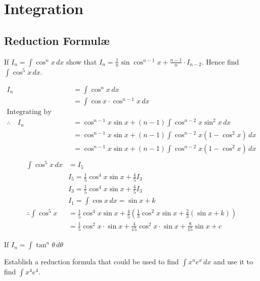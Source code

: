 \documentclass{standalone}
\begin{document}
	\chapter{Integration}
	\section{Reduction Formul\ae}
	
	\begin{example}
		If $I_n = \int \cos^n x \, dx$ show that $I_n = \frac{1}{n} \sin\cos^{n-1}x + \frac{n-1}{n}\cdot I_{n-2}$. Hence find $\int \cos^5x\, dx$.
	\end{example}
	
	\begin{align*}
							I_n  & = \int \cos^n x \, dx\\
								 & = \int \cos x \cdot \cos^{n-1}x\, dx\\
								 \text{Integrating by parts: }\\
			\therefore \quad I_n & = \cos^{n-1}x\sin x + (n-1)\int\cos^{n-2}x\sin^2x\,dx\\
								 & = \cos^{n-1}x\sin x + (n-1)\int\cos^{n-2}x(1-\cos^2x)\,dx\\
								 & = \cos^{n-1}x\sin x + (n-1)\int\cos^{n-2}x(1-\cos^2x)\,dx\\
	\end{align*}
	\begin{align*}
			\int \cos^5 x \, dx  & = I_5\\
							  	 & I_5 = \frac{1}{5} \cos^4x\sin x + \frac{4}{5}I_3\\
		& I_3 = \frac{1}{5} \cos^4x\sin x + \frac{4}{5}I_3\\
		& I_1 = \int \cos x \, dx = \sin x + k\\
		\therefore \int \cos^5 x & = \frac{1}{5}\cos^4x \sin x + \frac{4}{5}\left(\frac{1}{3}\cos^2x\sin x + \frac{2}{3}\left(\sin x + k\right)\right)\\
		& =\frac{1}{5}\cos^2x\cdot\sin x + \frac{4}{15} \cos^2 x \cdot \sin x + \frac{8}{15}\sin x + c                        
	\end{align*}	  						
	
	\begin{example}
		If $I_n = \int \tan^n\theta \, d\theta$
	\end{example}
	
	\begin{example}
		Establish a reduction formula that could be used to find $\int x^ne^x \, dx$ and use it to find $\int x^4e^4$.
	\end{example}
	
\end{document}
